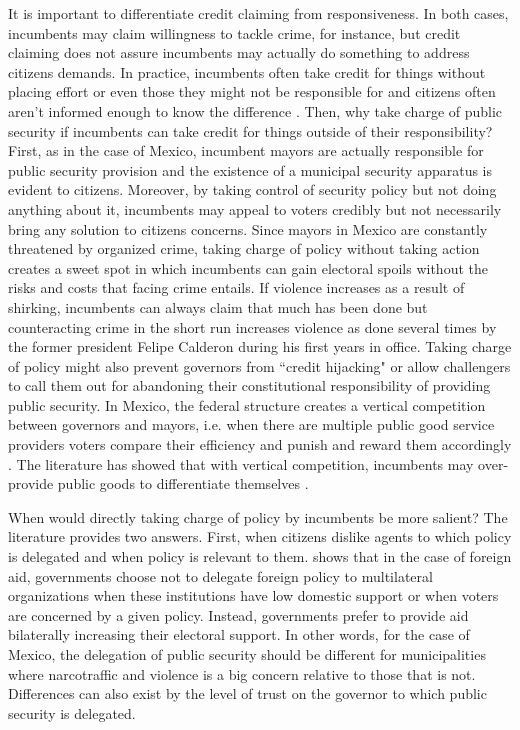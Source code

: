 It is important to differentiate  credit claiming from responsiveness. In both cases, incumbents may claim willingness to tackle crime, for instance, but credit claiming does not assure incumbents may actually do something to address citizens demands. In practice, incumbents often take credit for things without placing effort or even those they might not be responsible for and citizens often aren't informed enough to know the difference \citep{benedictis_kessner_2020}. Then, why take charge of public security if incumbents can take credit for things outside of their responsibility? First, as in the case of Mexico, incumbent mayors are actually responsible for public security provision and the existence of a municipal security apparatus is evident to citizens. Moreover, by taking control of security policy but not doing anything about it, incumbents may appeal to voters credibly but not necessarily bring any solution to citizens concerns. Since mayors in Mexico are constantly threatened by organized crime, taking charge of policy without taking action creates a sweet spot in which incumbents can gain electoral spoils without the risks and costs that facing crime entails. If violence increases as a result of shirking, incumbents can always claim that much has been done but counteracting crime in the short run increases violence as done several times by the former president Felipe Calderon during his first years in office. Taking charge of policy might also prevent governors from ``credit hijacking" \citep{bueno_2017} or allow challengers to call them out for abandoning their constitutional responsibility of providing public security. In Mexico, the federal structure creates a vertical competition between governors and mayors, i.e. when there are multiple public good service providers voters compare their efficiency and punish and reward them accordingly \citep{treisman_2000, rodden_2010}. The literature has showed that with vertical competition, incumbents may over-provide public goods to differentiate themselves \citep{salmon_1987, Breton_1996, treisman_2000}. %
 
When would directly taking charge of policy by incumbents be more salient? The literature provides two answers. First, when citizens dislike agents to which policy is delegated and when policy is relevant to them. \citet{milner_2004} shows that in the case of foreign aid, governments choose not to delegate foreign policy to multilateral organizations when these institutions have low domestic support or when voters are concerned by a given policy. Instead, governments prefer to provide aid bilaterally increasing their electoral support. In other words, for the case of Mexico, the delegation of public security should be different for municipalities where narcotraffic and violence is a big concern relative to those that is not. Differences can also exist by the level of trust on the governor to which public security is delegated.

